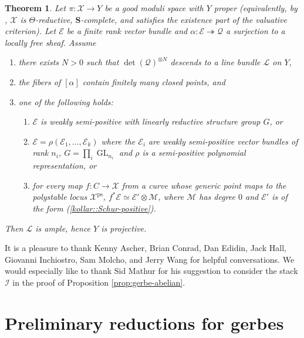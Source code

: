 \documentclass{amsart}
\newtheorem{theorem}{Theorem}[section]
\theoremstyle{definition}
\newcommand{\cX}{\mathcal{X}}
\newcommand{\cE}{\mathcal{E}}
\newcommand{\cL}{\mathcal{L}}
\newcommand{\cM}{\mathcal{M}}
\newcommand{\cQ}{\mathcal{Q}}
\newcommand{\sI}{\mathscr{I}}
\DeclareMathOperator{\ps}{ps}
\DeclareMathOperator{\GL}{GL}
\begin{document}
	\begin{theorem}\label{thm:kollar-ampleness}
		Let $\pi\colon\cX\to Y$ be a good moduli space with $Y$ proper (equivalently, by \cite[Theorem A]{AHLH}, $\cX$ is $\Theta$-reductive, $\textbf{S}$-complete, and satisfies the existence part of the valuative criterion). Let $\cE$ be a finite rank vector bundle and $\alpha\colon\cE\twoheadrightarrow\cQ$ a surjection to a locally free sheaf. Assume
		\begin{enumerate}
			\item there exists $N>0$ such that $\det(\cQ)^{\otimes N}$ descends to a line bundle $\cL$ on $Y$,
			\item the fibers of $[\alpha]$ contain finitely many closed points, and
			\item one of the following holds:
			\begin{enumerate}
				\item $\cE$ is weakly semi-positive with linearly reductive structure group $G$, or
				\item\label{kollar::Schur-positive} $\cE=\rho(\cE_1,\dots,\cE_k)$ where the $\cE_i$ are weakly semi-positive vector bundles of rank $n_i$, $G=\prod_i\GL_{n_i}$ and $\rho$ is a semi-positive polynomial representation, or
				\item for every map $f\colon C\to\cX$ from a curve whose generic point maps to the polystable locus $\cX^{\ps}$, $f^*\cE\simeq\cE'\otimes\cM$, where $\cM$ has degree $0$ and $\cE'$ is of the form (\ref{kollar::Schur-positive}).
			\end{enumerate}
		\end{enumerate}
		Then $\cL$ is ample, hence $Y$ is projective.
	\end{theorem}
	
	
	
	
	
	
	
	
	
	
	
	
	
	
	
	
	\acknowledgements It is a pleasure to thank Kenny Ascher, Brian Conrad, Dan Edidin, Jack Hall, Giovanni Inchiostro, Sam Molcho, and Jerry Wang for helpful conversations. We would especially like to thank Sid Mathur for his suggestion to consider the stack $\sI$ in the proof of Proposition \ref{prop:gerbe-abelian}.
	
	
	
	
	
	\section{Preliminary reductions for gerbes}
	
\end{document}
